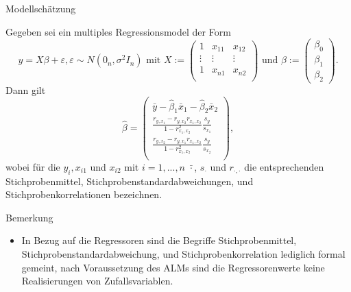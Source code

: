 \documentclass[
  8pt,
  ignorenonframetext,
]{beamer}
\providecommand{\tightlist}{%
  \setlength{\itemsep}{0pt}\setlength{\parskip}{0pt}}
\begin{document}
\begin{frame}{Modellschätzung}
\protect\hypertarget{modellschuxe4tzung-3}{}
\footnotesize
\begin{theorem}
\justifying
\normalfont
Gegeben sei ein multiples Regressionsmodel der Form
\begin{equation}
y = X\beta + \varepsilon, \varepsilon \sim N(0_n,\sigma^2I_n)
\mbox{ mit }
X
:=
\begin{pmatrix}
1      & x_{11} & x_{12} \\
\vdots & \vdots & \vdots \\
1      & x_{n1} & x_{n2} \\
\end{pmatrix}
\mbox{ und }
\beta
:=
\begin{pmatrix}
\beta_0 \\
\beta_1 \\
\beta_2
\end{pmatrix}.
\end{equation}
Dann gilt
\begin{equation}
\renewcommand{\arraystretch}{1.8}
\hat{\beta}
=
\begin{pmatrix}
\bar{y} - \hat{\beta}_1\bar{x}_1 - \hat{\beta}_2\bar{x}_2                        \\
\frac{r_{y,x_1} - r_{y,x_2}r_{x_1,x_2}}{1 - r_{x_1,x_2}^2} \frac{s_{y}}{s_{x_1}} \\
\frac{r_{y,x_2} - r_{y,x_1}r_{x_1,x_2}}{1 - r_{x_1,x_2}^2} \frac{s_{y}}{s_{x_2}} \\
\end{pmatrix},
\end{equation}
wobei für die $y_i,x_{i1}$ und $x_{i2}$ mit $i = 1,...,n$ $\bar{\cdot}$, $s_{\cdot}$
und $r_{\cdot,\cdot}$ die entsprechenden Stichprobenmittel, Stichprobenstandardabweichungen,
und Stichprobenkorrelationen bezeichnen.
\end{theorem}

Bemerkung

\begin{itemize}
\tightlist
\item
  \justifying In Bezug auf die Regressoren sind die Begriffe
  Stichprobenmittel, Stichprobenstandardabweichung, und
  Stichprobenkorrelation lediglich formal gemeint, nach Voraussetzung
  des ALMs sind die Regressorenwerte keine Realisierungen von
  Zufallsvariablen.
\end{itemize}
\end{frame}
\end{document}
